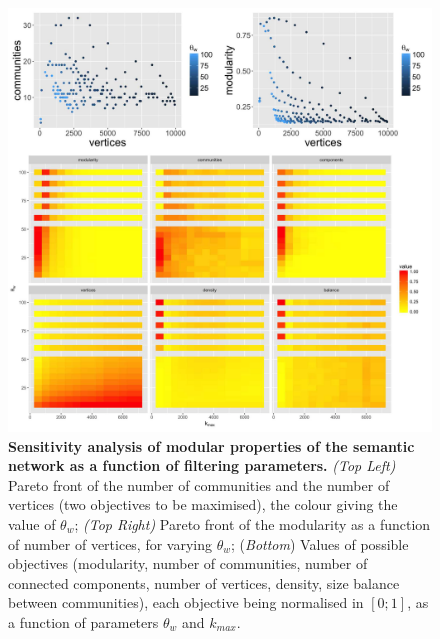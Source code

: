\documentclass[10pt]{article}
\begin{document}
\begin{figure}
\includegraphics[width=\linewidth]{figures/A-quantepistemo-sensitivity.jpg}
\caption{\textbf{Sensitivity analysis of modular properties of the semantic network as a function of filtering parameters.} \textit{(Top Left)} Pareto front of the number of communities and the number of vertices (two objectives to be maximised), the colour giving the value of $\theta_w$; \textit{(Top Right)} Pareto front of the modularity as a function of number of vertices, for varying $\theta_w$; (\textit{Bottom}) Values of possible objectives (modularity, number of communities, number of connected components, number of vertices, density, size balance between communities), each objective being normalised in $\left[0;1\right]$, as a function of parameters $\theta_w$ and $k_{max}$.\label{fig:sensitivity}}
\end{figure}
\end{document}
